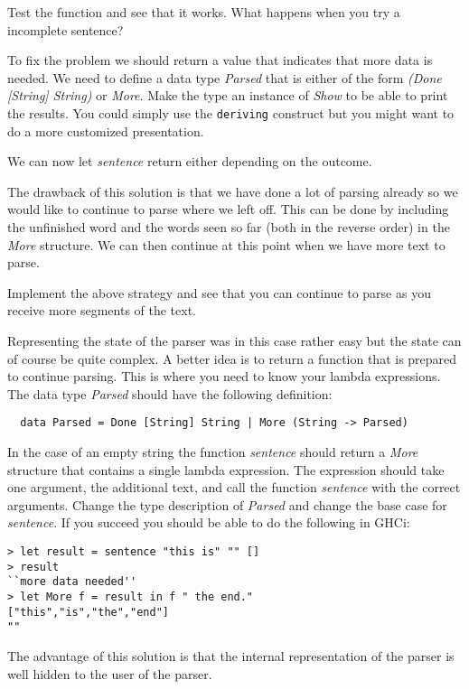 \documentclass[a4paper,11pt]{article}
\begin{document}
Test the function and see that it works. What happens when you try a
incomplete sentence?

To fix the problem we should return a value that indicates that more
data is needed. We need to define a data type {\em Parsed} that is
either of the form {\em (Done [String] String)} or {\em More}. Make
the type an instance of {\em Show} to be able to print the
results. You could simply use the {\tt deriving} construct but you
might want to do a more customized presentation.

We can now let {\em sentence} return either depending on the outcome.

The drawback of this solution is that we have done a lot of parsing
already so we would like to continue to parse where we left off. This
can be done by including the unfinished word and the words seen so far
(both in the reverse order) in the {\em More} structure. We can then
continue at this point when we have more text to parse.

Implement the above strategy and see that you can continue to parse as
you receive more segments of the text.

Representing the state of the parser was in this case rather easy but
the state can of course be quite complex. A better idea is to return a
function that is prepared to continue parsing. This is where you need
to know your lambda expressions. The data type {\em Parsed} should
have the following definition:

\begin{verbatim}
  data Parsed = Done [String] String | More (String -> Parsed)
\end{verbatim}

In the case of an empty string the function {\em sentence} should
return a {\em More} structure that contains a single lambda
expression. The expression should take one argument, the additional
text, and call the function {\em sentence} with the correct
arguments. Change the type description of {\em Parsed} and change the
base case for {\em sentence}. If you succeed you should be able to do
the following in GHCi:

\begin{verbatim}
> let result = sentence "this is" "" []
> result
``more data needed''
> let More f = result in f " the end."
["this","is","the","end"]
""
\end{verbatim}

The advantage of this solution is that the internal representation of
the parser is well hidden to the user of the parser.
\end{document}
